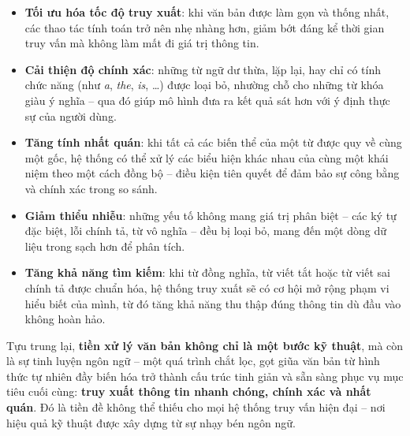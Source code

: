 \begin{itemize}
    \item \textbf{Tối ưu hóa tốc độ truy xuất}: khi văn bản được làm gọn và thống nhất, các thao tác tính toán trở nên nhẹ nhàng hơn, giảm bớt đáng kể thời gian truy vấn mà không làm mất đi giá trị thông tin.
    \item \textbf{Cải thiện độ chính xác}: những từ ngữ dư thừa, lặp lại, hay chỉ có tính chức năng (như \textit{a}, \textit{the}, \textit{is}, \dots) được loại bỏ, nhường chỗ cho những từ khóa giàu ý nghĩa -- qua đó giúp mô hình đưa ra kết quả sát hơn với ý định thực sự của người dùng.
    \item \textbf{Tăng tính nhất quán}: khi tất cả các biến thể của một từ được quy về cùng một gốc, hệ thống có thể xử lý các biểu hiện khác nhau của cùng một khái niệm theo một cách đồng bộ -- điều kiện tiên quyết để đảm bảo sự công bằng và chính xác trong so sánh.
    \item \textbf{Giảm thiểu nhiễu}: những yếu tố không mang giá trị phân biệt -- các ký tự đặc biệt, lỗi chính tả, từ vô nghĩa -- đều bị loại bỏ, mang đến một dòng dữ liệu trong sạch hơn để phân tích.
    \item \textbf{Tăng khả năng tìm kiếm}: khi từ đồng nghĩa, từ viết tắt hoặc từ viết sai chính tả được chuẩn hóa, hệ thống truy xuất sẽ có cơ hội mở rộng phạm vi hiểu biết của mình, từ đó tăng khả năng thu thập đúng thông tin dù đầu vào không hoàn hảo.
\end{itemize}

Tựu trung lại, \textbf{tiền xử lý văn bản không chỉ là một bước kỹ thuật}, mà còn là sự tinh luyện ngôn ngữ -- một quá trình chắt lọc, gọt giũa văn bản từ hình thức tự nhiên đầy biến hóa trở thành cấu trúc tinh giản và sẵn sàng phục vụ mục tiêu cuối cùng: \textbf{truy xuất thông tin nhanh chóng, chính xác và nhất quán}. Đó là tiền đề không thể thiếu cho mọi hệ thống truy vấn hiện đại -- nơi hiệu quả kỹ thuật được xây dựng từ sự nhạy bén ngôn ngữ.
